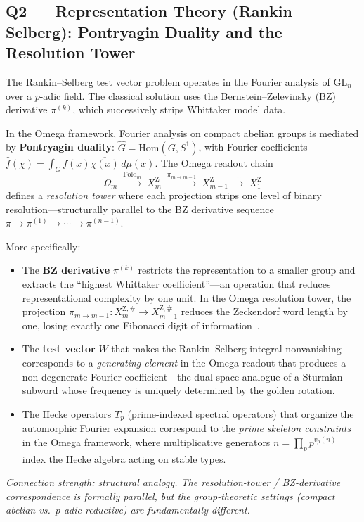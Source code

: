\subsection{Q2 --- Representation Theory (Rankin--Selberg):
  Pontryagin Duality and the Resolution Tower}
\label{ss:omega-q2}

\begin{remark}
The Rankin--Selberg test vector problem operates in the Fourier
analysis of $\mathrm{GL}_n$ over a $p$-adic field.
The classical solution uses the Bernstein--Zelevinsky (BZ) derivative
$\pi^{(k)}$, which successively strips Whittaker model data.

In the Omega framework, Fourier analysis on compact abelian groups
is mediated by \textbf{Pontryagin duality}:
$\widehat G=\mathrm{Hom}(G,S^1)$, with Fourier coefficients
$\widehat f(\chi)=\int_G f(x)\overline{\chi(x)}\,d\mu(x)$.
The Omega readout chain
\[
\Omega_m\;\xrightarrow{\mathrm{Fold}_m}\;X_m^{\mathrm Z}
\;\xrightarrow{\pi_{m\to m-1}}\;X_{m-1}^{\mathrm Z}
\;\xrightarrow{\;\cdots\;}\;X_1^{\mathrm Z}
\]
defines a \emph{resolution tower} where each projection strips one
level of binary resolution---structurally parallel to the BZ derivative
sequence $\pi\to\pi^{(1)}\to\cdots\to\pi^{(n-1)}$.

More specifically:
\begin{itemize}[nosep]
\item The \textbf{BZ derivative} $\pi^{(k)}$ restricts the
  representation to a smaller group and extracts the
  ``highest Whittaker coefficient''---an operation that
  reduces representational complexity by one unit.
  In the Omega resolution tower, the projection
  $\pi_{m\to m-1}\colon X_m^{\mathrm Z,\#}\to X_{m-1}^{\mathrm Z,\#}$
  reduces the Zeckendorf word length by one, losing exactly one
  Fibonacci digit of information~\cite{omega-fop}.
\item The \textbf{test vector} $W$ that makes the Rankin--Selberg
  integral nonvanishing corresponds to a \emph{generating element}
  in the Omega readout that produces a non-degenerate Fourier
  coefficient---the dual-space analogue of a Sturmian subword
  whose frequency is uniquely determined by the golden rotation.
\item The Hecke operators $T_p$ (prime-indexed spectral operators)
  that organize the automorphic Fourier expansion correspond to
  the \emph{prime skeleton constraints} in the Omega
  framework, where multiplicative generators $n=\prod_p p^{v_p(n)}$
  index the Hecke algebra acting on stable types.
\end{itemize}

\emph{Connection strength: structural analogy.
The resolution-tower / BZ-derivative correspondence is formally
parallel, but the group-theoretic settings (compact abelian vs.\
$p$-adic reductive) are fundamentally different.}
\end{remark}


